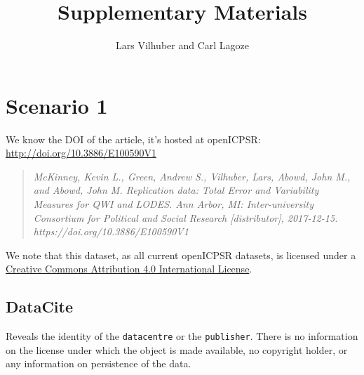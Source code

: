 \documentclass[10pt,letterpaper]{article}
\author{Lars Vilhuber and Carl Lagoze}
\title{Supplementary Materials}
\begin{document}
	
\section{Scenario 1}
We know the \ac{DOI} of the article, it's hosted at openICPSR: \url{http://doi.org/10.3886/E100590V1}
\lstset{numbers=left,numberstyle=\tiny,stepnumber=2}
\begin{quote}
	\it
McKinney, Kevin L., Green, Andrew S., Vilhuber, Lars, Abowd, John M., and Abowd, John M. Replication data: Total Error and Variability Measures for QWI and LODES. Ann Arbor, MI: Inter-university Consortium for Political and Social Research [distributor], 2017-12-15. https://doi.org/10.3886/E100590V1
\end{quote}

We note that this dataset, as all current openICPSR datasets, is licensed under a \href{http://creativecommons.org/licenses/by/4.0/}{Creative Commons Attribution 4.0 International License}. 

\subsection{DataCite}





Reveals the identity of the \texttt{datacentre} or the \texttt{publisher}. There is no information on the license under which the object is made available, no copyright holder, or any information on persistence of the data.
\end{document}
